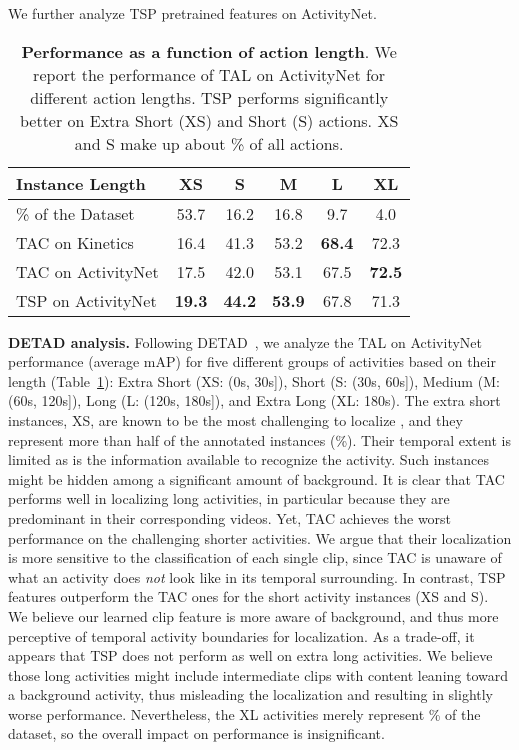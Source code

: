\documentclass[10pt,twocolumn,letterpaper]{article}
\begin{document}
\noindent We further analyze TSP pretrained features on ActivityNet.

\begin{table}[t!]
    \small
    \centering
    \caption{\textbf{Performance as a function of action length}. We report the performance of TAL on ActivityNet for different action lengths. TSP performs significantly better on Extra Short (XS) and Short (S) actions. XS and S make up about \% of all actions.
    }
    \vspace{-6pt}
    \begin{tabular}{l|ccccc}
\toprule
    Instance Length    &   XS   &   S    &   M    &   L    &   XL   \\\midrule
    \% of the Dataset  &   53.7 &   16.2 &   16.8 &   9.7  &   4.0  \\\midrule
    TAC on Kinetics    &   16.4 &   41.3 &   53.2 &\bf68.4 &   72.3 \\
    TAC on ActivityNet &   17.5 &   42.0 &   53.1 &   67.5 &\bf72.5 \\
    TSP on ActivityNet &\bf19.3 &\bf44.2 &\bf53.9 &   67.8 &   71.3 \\
\bottomrule
    \end{tabular}
    \label{table:analysis_detad}
\vspace{-1pt}
\end{table}
 

 \vspace{3pt}\noindent\textbf{DETAD analysis.}
Following DETAD~\cite{alwassel_eccv_2018}, we analyze the TAL on ActivityNet performance (average mAP) for five different groups of activities based on their length (Table~\ref{table:analysis_detad}): Extra Short (XS: (0s, 30s]), Short (S: (30s, 60s]), Medium (M: (60s, 120s]), Long (L: (120s, 180s]), and Extra Long (XL:  180s). The extra short instances, XS, are known to be the most challenging to localize \cite{alwassel_eccv_2018}, and they represent more than half of the annotated instances (\%). Their temporal extent is limited as is the information available to recognize the activity. Such instances might be hidden among a significant amount of background.
It is clear that TAC performs well in localizing long activities, in particular because they are predominant in their corresponding videos. Yet, TAC achieves the worst performance on the challenging shorter activities. We argue that their localization is more sensitive to the classification of each single clip, since TAC is unaware of what an activity does \textit{not} look like in its temporal surrounding.
In contrast, TSP features outperform the TAC ones for the short activity instances (XS and S). We believe our learned clip feature is more aware of background, and thus more perceptive of temporal activity boundaries for localization. 
As a trade-off, it appears that TSP does not perform as well on extra long activities. We believe those long activities might include intermediate clips with content leaning toward a background activity, thus misleading the localization and resulting in slightly worse performance. Nevertheless, the XL activities merely represent \% of the dataset, so the overall impact on performance is insignificant.
\end{document}
